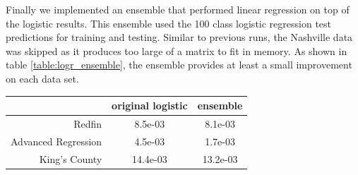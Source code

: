 \documentclass[10pt]{article}
\begin{document}
\begin{multicols}{2}
\begin{center}
			\label{fig:logr_MSE_Accuracy}
		\end{center}
		\par
			Finally we implemented an ensemble that performed linear regression on top of the logistic results. This ensemble used the 100 class logistic regression test predictions for training and testing. Similar to previous runs, the Nashville data was skipped as it produces too large of a matrix to fit in memory. As shown in table \ref{table:logr_ensemble}, the ensemble provides at least a small improvement on each data set.\\
        	\captionsetup{type=table}
			\begin{tabular}{r|c|c}
				& \small{original logistic} & \small{ensemble} \\
				\hline
				\small{Redfin} & \small{8.5e-03} & \small{8.1e-03} \\
				\hline
				\small{Advanced Regression} & \small{4.5e-03} & \small{1.7e-03} \\
				\hline
				\small{King's County} & \small{14.4e-03} & \small{13.2e-03} \\
				\hline
			\end{tabular}
			\label{table:logr_ensemble}        
			\setlength{\parindent}{15pt}
		\par
 			

\end{multicols}
\end{document}

